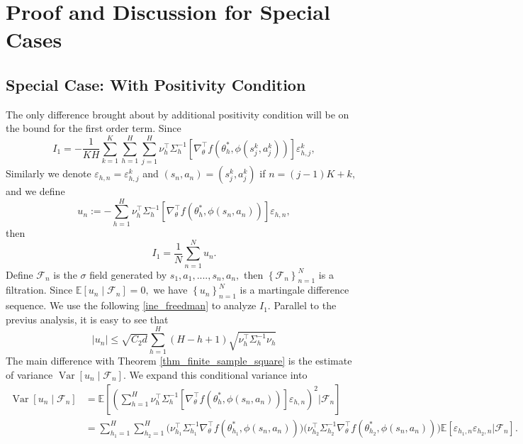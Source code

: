 \documentclass{article}
\numberwithin{equation}{section}
\theoremstyle{plain}
\theoremstyle{definition}
\theoremstyle{remark}
\begin{document}
\section{Proof and Discussion for Special Cases}
\subsection{Special Case: With Positivity Condition}\label{sec:positivity}
The only difference brought about by additional positivity condition will be on the bound for the first order term. Since
\begin{equation*}
    I_1 = -\frac{1}{KH} \sum_{k=1}^K \sum_{h=1}^{H} \sum_{j=1}^{H} \nu_{h}^{\top} \Sigma_{h}^{-1}\left[\nabla_{\theta}^{\top} f\left(\theta_{h}^*, \phi\left(s_{j}^{k}, a_{j}^{k}\right)\right)\right] \varepsilon_{h, j}^{k},
\end{equation*}
Similarly we denote $\varepsilon_{h,n} = \varepsilon_{h,j}^k$ and $(s_n,a_n) = (s_j^k,a_j^k)$ if $n = (j-1)K + k,$ and we define
\begin{equation*}
    u_n := -\sum_{h=1}^H \nu_{h}^{\top} \Sigma_{h}^{-1}\left[\nabla_{\theta}^{\top} f\left(\theta_{h}^*, \phi\left(s_n, a_n\right)\right)\right] \varepsilon_{h, n},
\end{equation*}
then
\begin{equation*}
    I_1 = \frac{1}{N} \sum_{n=1}^N u_n.
\end{equation*}
Define $\mathcal{F}_n$ is the $\sigma$ field generated by $s_1,a_1,....,s_n,a_n,$ then $\left\{\mathcal{F}_n\right\}_{n=1}^N$ is a filtration. Since $\mathbb{E}\left[u_n \mid \mathcal{F}_n\right] = 0,$ we have $\left\{u_n\right\}_{n=1}^N$ is a martingale difference sequence. We use the following \ref{ine_freedman} to analyze $I_1.$ Parallel to the previus analysis, it is easy to see that
\begin{equation*}
    \left|u_n\right| \leq \sqrt{C_{2} d} \sum_{h=1}^{H}(H-h+1) \sqrt{\nu_{h}^{\top} \Sigma_{h}^{-1} \nu_{h}}
\end{equation*}
The main difference with Theorem \ref{thm_finite_sample_square} is the estimate of variance $\operatorname{Var}\left[u_n\mid \mathcal{F}_n\right].$ We expand this conditional variance into
\begin{align*}
    \operatorname{Var}\left[u_n\mid \mathcal{F}_n\right]
    &= \mathbb{E}\left[\left(\sum_{h=1}^H \nu_{h}^{\top} \Sigma_{h}^{-1}\left[\nabla_{\theta}^{\top} f\left(\theta_{h}^*, \phi\left(s_n, a_n\right)\right)\right] \varepsilon_{h, n}\right)^2 \bigg| \mathcal{F}_n\right] \\
    &= \sum_{h_1=1}^H \sum_{h_2=1}^H \bigg(\nu_{h_1}^{\top} \Sigma_{h_1}^{-1}\nabla_{\theta}^{\top} f\left(\theta_{h_1}^*, \phi\left(s_n, a_n\right)\right)\bigg) \bigg(\nu_{h_2}^{\top} \Sigma_{h_2}^{-1}\nabla_{\theta}^{\top} f\left(\theta_{h_2}^*, \phi\left(s_n, a_n\right)\right)\bigg) \mathbb{E}\left[\varepsilon_{h_1, n} \varepsilon_{h_2, n} \bigg| \mathcal{F}_n\right].
\end{align*}
\end{document}
